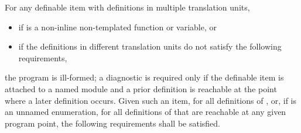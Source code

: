 \pnum
For any definable item  with definitions in multiple translation units,
\begin{itemize}
\item
if  is a non-inline non-templated function or variable, or
\item
if the definitions in different translation units
do not satisfy the following requirements,
\end{itemize}
the program is ill-formed;
a diagnostic is required only
if the definable item is attached to a named module and
a prior definition is reachable at the point where a later definition occurs.
Given such an item,
for all definitions of , or,
if  is an unnamed enumeration,
for all definitions of  that are reachable at any given program point,
the following requirements shall be satisfied.
